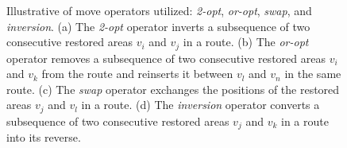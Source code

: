 \documentclass[preprint,5pt]{elsarticle}
\begin{document}
\begin{figure}[htb]
    \centering
    \caption{Illustrative of move operators utilized: \emph{2-opt}, \emph{or-opt}, \emph{swap}, and \emph{inversion}. (a) The \emph{2-opt} operator inverts a subsequence of two consecutive restored areas $v_i$ and $v_j$ in a route. (b) The \emph{or-opt} operator removes a subsequence of two consecutive restored areas $v_i$ and $v_k $ from the route and reinserts it between $v_l$ and $v_n$ in the same route. (c) The \emph{swap} operator exchanges the positions of the restored areas $v_j$ and $v_l$ in a route. (d) The \emph{inversion} operator converts a subsequence of two consecutive restored areas $v_j$ and $v_k$ in a route into its reverse.}
    \label{Move-Operators}
\end{figure}
\end{document}
